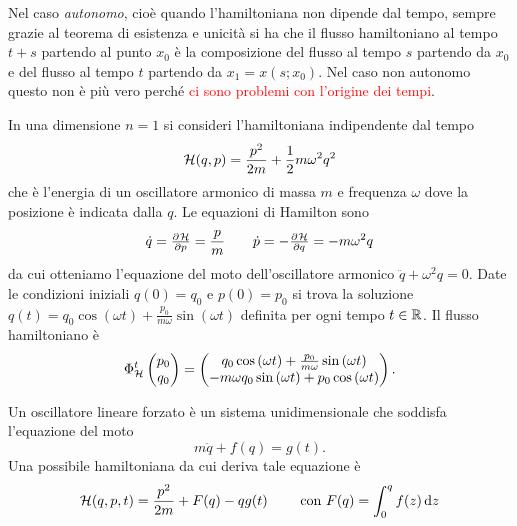 Nel caso \emph{autonomo}, cioè quando l'hamiltoniana non dipende dal tempo, sempre grazie al teorema di esistenza e unicità si ha che il flusso hamiltoniano al tempo $ t+s $ partendo al punto $ x_0 $ è la composizione del flusso al tempo $ s $ partendo da $ x_0 $ e del flusso al tempo $ t $ partendo da $ x_1 = x(s; x_0) $. Nel caso non autonomo questo non è più vero perché \textcolor{red}{ci sono problemi con l'origine dei tempi}.

\begin{example}
    In una dimensione $ n = 1 $ si consideri l'hamiltoniana indipendente dal tempo
    \[
        \mathcal{H}(q, p) = \frac{p^2}{2m} + \frac{1}{2} m \omega^2 q^2
    \]
    che è l'energia di un oscillatore armonico di massa $ m $ e frequenza $ \omega $ dove la posizione è indicata dalla $ q $. Le equazioni di Hamilton sono
    \[
        \dot{q} = \pd{\ham}{p} = \frac{p}{m} \qquad \dot{p} = -\pd{\ham}{q} = -m\omega^2 q
    \]
    da cui otteniamo l'equazione del moto dell'oscillatore armonico $ \ddot{q} + \omega^2 q = 0 $. Date le condizioni iniziali $ q(0) = q_0 $ e $ p(0) = p_0 $ si trova la soluzione $ q(t) = q_0 \cos{(\omega t)} + \frac{p_0}{m\omega} \sin{(\omega t)} $ definita per ogni tempo $ t \in \mathbb{R} $. Il flusso hamiltoniano è
    \[
        \Phi^t_{\mathcal{H}}
        \begin{pmatrix}
        p_0 \\
        q_0
        \end{pmatrix}
        =
        \begin{pmatrix}
        q_0 \cos{(\omega t)} + \frac{p_0}{m\omega} \sin{(\omega t)} \\
        -m \omega q_0 \sin{(\omega t)} + p_0\cos{(\omega t)}
        \end{pmatrix}.
    \]
\end{example}

\begin{example}
    Un oscillatore lineare forzato è un sistema unidimensionale che soddisfa l'equazione del moto
    \[
        m\ddot{q} + f(q) = g(t).
    \]
    Una possibile hamiltoniana da cui deriva tale equazione è
    \[
        \ham(q, p, t) = \frac{p^2}{2m} + F(q) - q g(t) \qquad \text{ con } F(q) = \int_0^q f(z) \dif{z}
    \]
\end{example}


